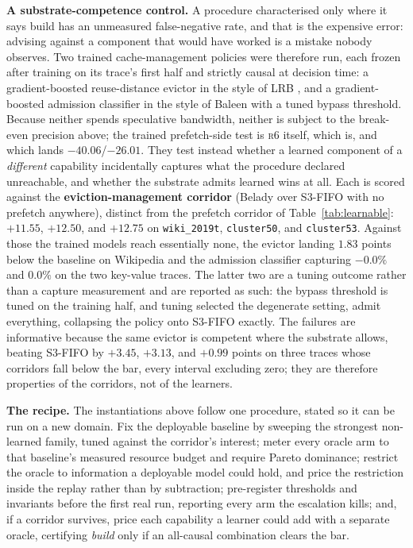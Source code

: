 \documentclass[letterpaper]{article} %
\newcommand{\rung}[1]{\textsc{#1}}
\begin{document}
\textbf{A substrate-competence control.} A procedure characterised only where it says build has an unmeasured false-negative rate, and that is the expensive error: advising against a component that would have worked is a mistake nobody observes. Two trained cache-management policies were therefore run, each frozen after training on its trace's first half and strictly causal at decision time: a gradient-boosted reuse-distance evictor in the style of LRB \citep{lrb}, and a gradient-boosted admission classifier in the style of Baleen \citep{baleen} with a tuned bypass threshold. Because neither spends speculative bandwidth, neither is subject to the break-even precision above; the trained prefetch-side test is \rung{r6} itself, which is, and which lands $-40.06$/$-26.01$. They test instead whether a learned component of a \emph{different} capability incidentally captures what the procedure declared unreachable, and whether the substrate admits learned wins at all. Each is scored against the \textbf{eviction-management corridor} (Belady over S3-FIFO with no prefetch anywhere), distinct from the prefetch corridor of Table~\ref{tab:learnable}: $+11.55$, $+12.50$, and $+12.75$ on \texttt{wiki\_2019t}, \texttt{cluster50}, and \texttt{cluster53}. Against those the trained models reach essentially none, the evictor landing $1.83$ points below the baseline on Wikipedia and the admission classifier capturing $-0.0\%$ and $0.0\%$ on the two key-value traces. The latter two are a tuning outcome rather than a capture measurement and are reported as such: the bypass threshold is tuned on the training half, and tuning selected the degenerate setting, admit everything, collapsing the policy onto S3-FIFO exactly. The failures are informative because the same evictor is competent where the substrate allows, beating S3-FIFO by $+3.45$, $+3.13$, and $+0.99$ points on three traces whose corridors fall below the bar, every interval excluding zero; they are therefore properties of the corridors, not of the learners.

\textbf{The recipe.} The instantiations above follow one procedure, stated so it can be run on a new domain. Fix the deployable baseline by sweeping the strongest non-learned family, tuned against the corridor's interest; meter every oracle arm to that baseline's measured resource budget and require Pareto dominance; restrict the oracle to information a deployable model could hold, and price the restriction inside the replay rather than by subtraction; pre-register thresholds and invariants before the first real run, reporting every arm the escalation kills; and, if a corridor survives, price each capability a learner could add with a separate oracle, certifying \emph{build} only if an all-causal combination clears the bar.
\end{document}
